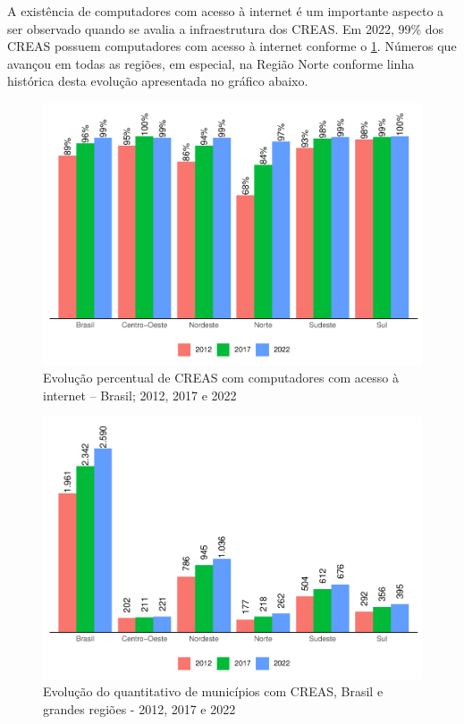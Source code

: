 \documentclass[
  brazilian]{report}
\begin{document}
A existência de computadores com acesso à internet é um importante
aspecto a ser observado quando se avalia a infraestrutura dos CREAS. Em
2022, 99\% dos CREAS possuem computadores com acesso à internet conforme
o \cref{fig:CREAS-internet-percentual}. Números que avançou em todas as
regiões, em especial, na Região Norte conforme linha histórica desta
evolução apresentada no gráfico abaixo.

\begin{figure}
\includegraphics{Censo-SUAS-2022_files/figure-latex/CREAS-internet-percentual-1} \caption[Evolução percentual de CREAS com computadores com acesso à internet – Brasil]{Evolução percentual de CREAS com computadores com acesso à internet – Brasil; 2012, 2017 e 2022}\label{fig:CREAS-internet-percentual}
\end{figure}

\begin{figure}
\includegraphics{Censo-SUAS-2022_files/figure-latex/CREAS-quantidade-municipios-1} \caption[Evolução do quantitativo de municípios com CREAS, Brasil e grandes regiões - 2012, 2017 e 2022]{Evolução do quantitativo de municípios com CREAS, Brasil e grandes regiões - 2012, 2017 e 2022}\label{fig:CREAS-quantidade-municipios}
\end{figure}
\end{document}
